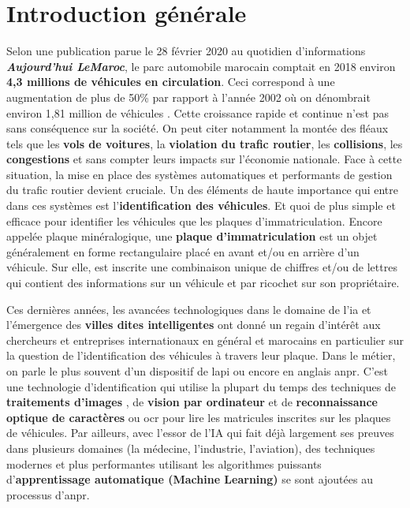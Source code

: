 \chapter*{\textbf{Introduction générale}}
Selon une publication parue le 28 février 2020 au quotidien d'informations \textbf{\textit{Aujourd'hui LeMaroc}}, le parc automobile marocain comptait en 2018 environ \textbf{4,3 millions de véhicules en circulation}. Ceci correspond à une augmentation de plus de 50\% par rapport à
l'année 2002 où on dénombrait environ 1,81 million de véhicules \cite{ajLeMaroc}. Cette croissance rapide et continue n’est pas sans conséquence sur la société. On peut citer notamment la montée des fléaux tels que les \textbf{vols de voitures}, la \textbf{violation du trafic routier}, les \textbf{collisions}, les \textbf{congestions} et sans compter leurs impacts sur l’économie nationale. Face à cette situation, la mise en place des systèmes automatiques et performants de gestion du trafic routier devient cruciale. Un des éléments de haute importance qui entre dans ces systèmes est l’\textbf{identification des véhicules}. Et quoi de plus simple et efficace pour identifier les véhicules que les plaques d’immatriculation. Encore appelée plaque minéralogique, une \textbf{plaque d’immatriculation} est un objet généralement en forme rectangulaire placé en avant et/ou en arrière d'un véhicule. Sur elle, est inscrite une combinaison unique de chiffres et/ou de lettres qui contient des informations sur un véhicule et par ricochet sur son propriétaire. 

Ces dernières années, les avancées technologiques dans le domaine de l’\acrfull{ia} et l'émergence des \textbf{villes dites intelligentes} ont donné un regain d'intérêt aux chercheurs et entreprises internationaux en général et marocains en particulier sur la question de l’identification des véhicules à travers leur plaque. Dans le métier, on  parle le plus souvent d’un dispositif de \acrfull{lapi} ou encore en anglais \acrfull{anpr}. C’est une technologie d’identification qui utilise la plupart du temps des techniques de \textbf{traitements d’images} , de \textbf{vision par ordinateur} et de \textbf{reconnaissance optique de caractères} ou \acrfull{ocr} pour lire les matricules inscrites sur les plaques de véhicules. Par ailleurs, avec l’essor de l’IA qui fait déjà largement ses preuves dans plusieurs domaines (la médecine, l’industrie, l’aviation), des techniques modernes et plus performantes utilisant les algorithmes puissants d’\textbf{apprentissage automatique (Machine Learning)} se sont ajoutées au processus d’\acrshort{anpr}. 

